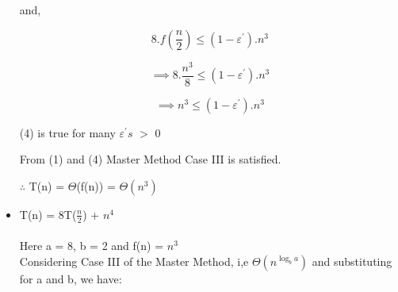 \documentclass{article}
\begin{document}
\begin{itemize}
  and,
  
  \begin{equation}
    8.f(\frac{n}{2}) \leq (1 - \varepsilon^{\prime}).n^{3}
   \end{equation}

  \begin{equation}
  \implies 8.\frac{n^{3}}{8 } \leq (1 - \varepsilon^{\prime}).n^{3}
  \end{equation}

  \begin{equation}
  \implies n^{3} \leq (1 - \varepsilon^{\prime}).n^{3}
  \end{equation}
  
  (4) is true for many $\varepsilon^{\prime}s$ $>$ 0

  From (1) and (4) Master Method Case III is satisfied.

  $\therefore$ T(n) = $\Theta$(f(n)) = $\Theta(n^{3})$

\item T(n) = 8T($\frac{n}{2}$) + $n^{4}$ \\ \\

  Here a = 8, b = 2 and f(n) = $n^{3}$ \\
  Considering Case III of the Master Method, i,e $\Theta(n^{\log_b {a}})$ and substituting for a and b, we have: \\
  

  
\end{itemize}
\end{document}
